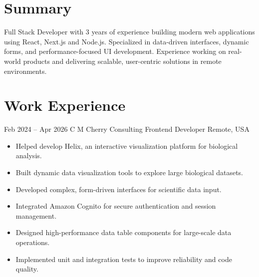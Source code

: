 \documentclass[11pt,a4paper,sans]{moderncv}
\begin{document}
\makecvtitle

\vspace*{-1cm}

\section{Summary}

{
\justifying
\setlength{\emergencystretch}{3em}

Full Stack Developer with 3 years of experience building modern web applications using React, Next.js and Node.js. Specialized in data-driven interfaces, dynamic forms, and performance-focused UI development. Experience working on real-world products and delivering scalable, user-centric solutions in remote environments.

\par
}

\section{Work Experience}

\cventry
  {Feb 2024 – Apr 2026}
  {C M Cherry Consulting}
  {Frontend Developer}
  {Remote, USA}
  {}
  {\normalsize\begin{itemize}
    \setlength{\itemsep}{1.5pt}
    \item Helped develop Helix, an interactive visualization platform for biological analysis. 
    \item Built dynamic data visualization tools to explore large biological datasets. 
    \item Developed complex, form-driven interfaces for scientific data input. 
    \item Integrated Amazon Cognito for secure authentication and session management. 
    \item Designed high-performance data table components for large-scale data operations. 
    \item Implemented unit and integration tests to improve reliability and code quality.
  \end{itemize}}

\vspace*{0.2cm}
\end{document}
